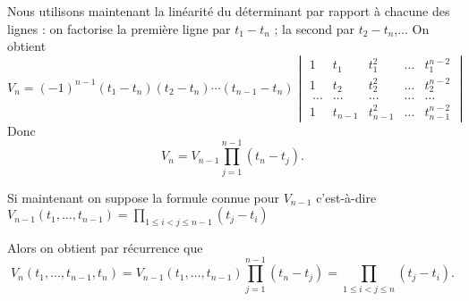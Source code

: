 {{Nous utilisons maintenant la linéarité du déterminant par rapport à chacune des lignes :
on factorise la première ligne par $t_1-t_n$ ; la second par $t_2-t_n$,...
On obtient 
$$V_n = (-1)^{n-1}(t_1-t_n)(t_2-t_n)\cdots(t_{n-1}-t_n)
\begin{vmatrix}
1 & t_1 & t_1^2 & \ldots & t_1^{n-2} \\
1 & t_2 & t_2^2 & \ldots & t_2^{n-2} \\\
\ldots&\ldots&\ldots& \ldots & \ldots \\
1 & t_{n-1} & t_{n-1}^2 & \ldots & t_{n-1}^{n-2}
\end{vmatrix} 
$$
Donc $$V_n = V_{n-1}\prod_{j=1}^{n-1}(t_n-t_j).$$

Si maintenant on suppose la formule connue pour $V_{n-1}$
c'est-à-dire $V_{n-1}(t_1,\ldots,t_{n-1})
= \prod_{1 \le i < j \le n-1} (t_j - t_i)$

Alors on obtient par récurrence que
$$V_n(t_1,\ldots,t_{n-1},t_n)= V_{n-1}(t_1,\ldots,t_{n-1})\prod_{j=1}^{n-1}(t_n-t_j) =  \prod_{1 \le i < j \le n} (t_j - t_i).$$
}
}
